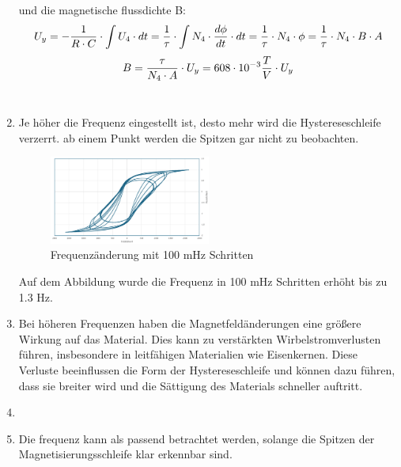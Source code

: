 \documentclass[a4paper,twoside,12pt,DIV=13,BCOR=5mm,numbers=noenddot,cleardoublepage=empty]{scrbook}
\begin{document}
\begin{enumerate}
                und die magnetische flussdichte B:
                \begin{equation}
                    U_y = -\frac{1}{R \cdot C} \cdot \int U_4 \cdot dt \\
                    = \frac{1}{\tau} \cdot \int N_4 \cdot \frac{d\phi}{dt} \cdot dt \\
                    = \frac{1}{\tau} \cdot N_4 \cdot \phi \\
                    = \frac{1}{\tau} \cdot N_4 \cdot B \cdot A \\
                \end{equation}
                \begin{equation}
                    B = \frac{\tau}{N_4 \cdot A} \cdot U_y \\
                    = 608 \cdot 10^{-3} \frac{T}{V} \cdot U_y \\
                \end{equation}\\
            \item Je höher die Frequenz eingestellt ist, desto mehr wird die Hystereseschleife verzerrt. ab einem Punkt werden die Spitzen gar nicht zu beobachten.
            \begin{figure}[h] 
            \centering
            \includegraphics[width=0.5\textwidth]{pictures/freqAnderung.png} 
            \caption{Frequenzänderung mit 100 mHz Schritten}
            \label{fig:meinbild}
            \end{figure}
            Auf dem Abbildung wurde die Frequenz in 100 mHz Schritten erhöht bis zu 1.3 Hz.\\
            \item Bei höheren Frequenzen haben die Magnetfeldänderungen eine größere Wirkung auf das Material. Dies kann zu verstärkten Wirbelstromverlusten führen, insbesondere in leitfähigen Materialien wie Eisenkernen. Diese Verluste beeinflussen die Form der Hystereseschleife und können dazu führen, dass sie breiter wird und die Sättigung des Materials schneller auftritt.
            \item  
            \item Die frequenz kann als passend betrachtet werden, solange die Spitzen der Magnetisierungsschleife klar erkennbar sind.

\end{enumerate}
\end{document}
